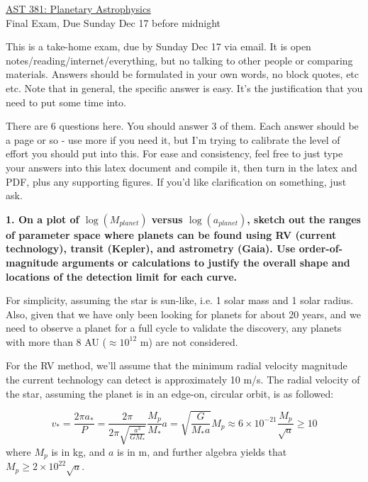 \documentclass[12pt,preprint]{aastex61}
\begin{document}
\begin{center}
\vspace{0.2in}\underline{\Large AST 381: Planetary Astrophysics}\\
\large Final Exam, Due Sunday Dec 17 before midnight\\
\end{center}

\vspace{-0.1in} This is a take-home exam, due by Sunday Dec 17 via email. It is open notes/reading/internet/everything, but no talking to other people or comparing materials. Answers should be formulated in your own words, no block quotes, etc etc. Note that in general, the specific answer is easy. It's the justification that you need to put some time into.

There are 6 questions here. You should answer 3 of them. Each answer should be a page or so - use more if you need it, but I'm trying to calibrate the level of effort you should put into this. For ease and consistency, feel free to just type your answers into this latex document and compile it, then turn in the latex and PDF, plus any supporting figures. If you'd like clarification on something, just ask.

{\bf 1. On a plot of $\log(M_{planet})$ versus $\log(a_{planet})$, sketch out the ranges of parameter space where planets can be found using RV (current technology), transit (Kepler), and astrometry (Gaia). Use order-of-magnitude arguments or calculations to justify the overall shape and locations of the detection limit for each curve.}

For simplicity, assuming the star is sun-like, i.e. 1 solar mass and 1 solar radius. Also, given that we have only been looking for planets for about 20 years, and we need to observe a planet for a full cycle to validate the discovery, any planets with more than 8 AU ($\approx 10^{12}$ m) are not considered.

For the RV method, we'll assume that the minimum radial velocity magnitude the current technology can detect is approximately 10 m/s. The radial velocity of the star, assuming the planet is in an edge-on, circular orbit, is as followed:

\begin{equation}
v_* = \frac{2\pi a_*}{P} = \frac{2\pi}{2\pi\sqrt{\frac{a^3}{GM_*}}}\frac{M_p}{M_*}a = \sqrt{\frac{G}{M_*a}} M_p \approx 6\times10^{-21} \frac{M_p}{\sqrt{a}} \geq 10
\end{equation}
where $M_p$ is in kg, and $a$ is in m, and further algebra yields that $M_p \geq 2\times10^{22} \sqrt{a}$.
\end{document}
